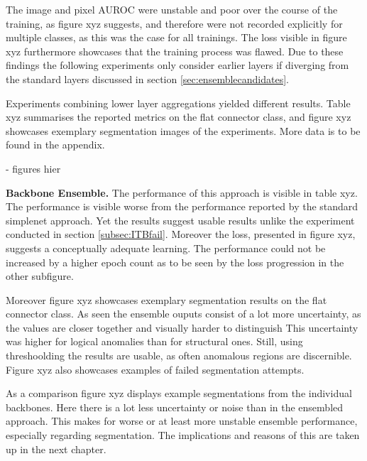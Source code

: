 

The image and pixel AUROC were unstable and poor over the course of the training, 
as figure xyz suggests, and therefore were not recorded explicitly for multiple classes, as this was the case for all trainings. The loss visible in figure xyz furthermore 
showcases that the training process was flawed. Due to these findings the following experiments only consider earlier layers if diverging from the standard layers 
discussed in section \ref{sec:ensemblecandidates}.




Experiments combining lower layer aggregations yielded different results. Table xyz summarises the reported metrics on the flat connector class, and figure xyz showcases exemplary 
segmentation images of the experiments. More data is to be found in the appendix.

- figures hier


\textbf{Backbone Ensemble.} The performance of this approach is visible in table xyz. The performance is visible worse from the performance 
reported by the standard simplenet approach. Yet the results suggest usable results unlike the experiment conducted in section \ref{subsec:ITBfail}. 
Moreover the loss, presented in figure xyz, suggests a conceptually adequate learning. The performance could not be increased by a higher 
epoch count as to be seen by the loss progression in the other subfigure.



Moreover figure xyz showcases exemplary segmentation results on the flat connector class. As 
seen the ensemble ouputs consist of a lot more uncertainty, as the values are closer together and visually harder to distinguish This uncertainty 
was higher for logical anomalies than for structural ones. Still, 
using threshoolding the results are usable, as often anomalous regions are discernible. Figure xyz also showcases examples of failed segmentation 
attempts. 



As a comparison figure xyz displays example segmentations from the individual backbones. Here there is a lot less uncertainty or 
noise than in the ensembled approach. This makes for worse or at least more unstable ensemble performance, especially regarding segmentation. 
The implications and reasons of this are taken up in the next chapter.






